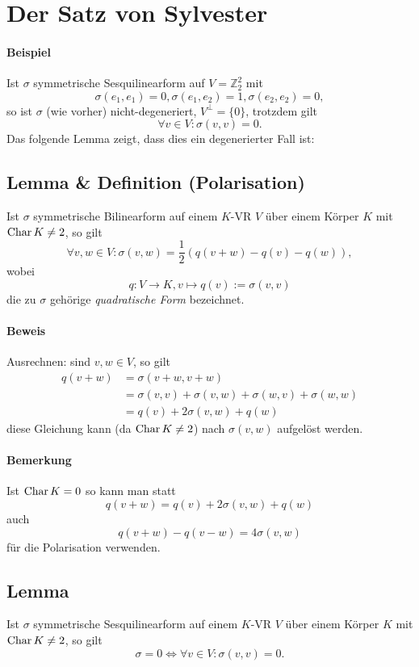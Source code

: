 \section{Der Satz von Sylvester}
\paragraph{Beispiel}
	Ist $ \sigma $ symmetrische Sesquilinearform auf $ V=\mathbb{Z}^2_2 $ mit
		\[ \sigma(e_1,e_1)=0, \sigma(e_1,e_2) = 1, \sigma(e_2,e_2) = 0, \]
	so ist $ \sigma $ (wie vorher) nicht-degeneriert, $ V^\perp =\{0\}$, trotzdem gilt
		\[ \forall v\in V: \sigma(v,v) = 0. \]
	Das folgende Lemma zeigt, dass dies ein degenerierter Fall ist:
	
\subsection{Lemma \& Definition (Polarisation)}
	Ist $ \sigma $ symmetrische Bilinearform auf einem $ K $-VR $ V $ über einem Körper $ K $ mit $ \operatorname{Char} K \neq 2 $, so gilt
		\[ \forall v,w\in V: \sigma(v,w)=\frac{1}{2}\left(q(v+w)-q(v)-q(w)\right), \]
	wobei
		\[ q:V\to K, v\mapsto q(v):= \sigma(v,v) \]
	die zu $ \sigma $ gehörige \emph{quadratische Form} bezeichnet.
\paragraph{Beweis}
	Ausrechnen: sind $ v,w\in V $, so gilt
	\begin{align*}
	q(v+w) &= \sigma(v+w,v+w)\\
			&= \sigma(v,v) + \sigma(v,w)+\sigma(w,v)+\sigma(w,w)\\
			&= q(v)+2\sigma(v,w)+q(w)
	\end{align*}
	diese Gleichung kann (da $ \operatorname{Char} K\neq 2 $) nach $ \sigma(v,w) $ aufgelöst werden.
\paragraph{Bemerkung}
	Ist $ \operatorname{Char} K=0 $ so kann man statt
		\[ q(v+w)=q(v)+2\sigma(v,w)+q(w) \]
	auch
		\[ q(v+w)-q(v-w) = 4 \sigma(v,w) \]
	für die Polarisation verwenden.
	
\subsection{Lemma}
	Ist $ \sigma $ symmetrische Sesquilinearform auf einem $ K $-VR $ V $ über einem Körper $ K $ mit $ \operatorname{Char} K \neq 2 $, so gilt
		\[ \sigma = 0 \Leftrightarrow \forall v\in V: \sigma(v,v) = 0. \]
